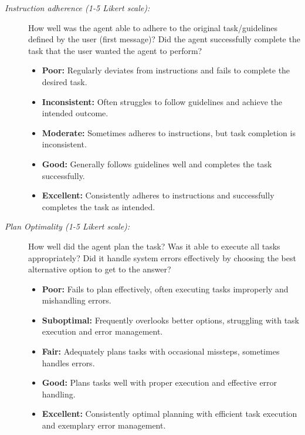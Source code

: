 \documentclass[11pt]{article}
\begin{document}
\begin{description}
    \item[\textit{Instruction adherence (1-5 Likert scale):}] How well was the agent able to adhere to the original task/guidelines defined by the user (first message)? Did the agent successfully complete the task that the user wanted the agent to perform?
    
    \begin{itemize}[itemsep=1mm, parsep=0.5pt]
        \item[1 -] \textbf{Poor:} Regularly deviates from instructions and fails to complete the desired task.
        \item[2 -] \textbf{Inconsistent:} Often struggles to follow guidelines and achieve the intended outcome.
        \item[3 -] \textbf{Moderate:} Sometimes adheres to instructions, but task completion is inconsistent.
        \item[4 -] \textbf{Good:} Generally follows guidelines well and completes the task successfully.
        \item[5 -] \textbf{Excellent:} Consistently adheres to instructions and successfully completes the task as intended.
    \end{itemize}
    
    \item[\textit{Plan Optimality (1-5 Likert scale):}] How well did the agent plan the task? Was it able to execute all tasks appropriately? Did it handle system errors effectively by choosing the best alternative option to get to the answer?
    
    \begin{itemize}[itemsep=1mm, parsep=0.5pt]
        \item[1 -] \textbf{Poor:} Fails to plan effectively, often executing tasks improperly and mishandling errors.
        \item[2 -] \textbf{Suboptimal:} Frequently overlooks better options, struggling with task execution and error management.
        \item[3 -] \textbf{Fair:} Adequately plans tasks with occasional missteps, sometimes handles errors.
        \item[4 -] \textbf{Good:} Plans tasks well with proper execution and effective error handling.
        \item[5 -] \textbf{Excellent:} Consistently optimal planning with efficient task execution and exemplary error management.
    \end{itemize}
\end{description}
\end{document}
